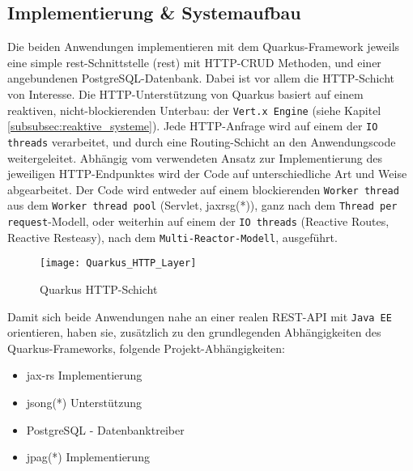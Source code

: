 \subsection{Implementierung \& Systemaufbau}
\label{section:implementierung}
Die beiden Anwendungen implementieren mit dem Quarkus-Framework jeweils eine simple \acrshort{rest}-Schnittstelle (\acrlong{rest})
mit HTTP-CRUD Methoden, und einer angebundenen PostgreSQL-Datenbank.
Dabei ist vor allem die HTTP-Schicht von Interesse. Die HTTP-Unterstützung von Quarkus basiert auf einem reaktiven, nicht-blockierenden
Unterbau: der \verb|Vert.x Engine| (siehe Kapitel \ref{subsubsec:reaktive_systeme}).
Jede HTTP-Anfrage wird auf einem der \verb|IO threads|
verarbeitet, und durch eine Routing-Schicht an den Anwendungscode weitergeleitet.
Abhängig vom verwendeten Ansatz zur Implementierung des jeweiligen HTTP-Endpunktes wird der Code auf unterschiedliche Art und Weise abgearbeitet.
Der Code wird entweder auf einem blockierenden \verb|Worker thread| aus dem \verb|Worker thread pool| (Servlet, \Gls{jaxrsg}(*)),
ganz nach dem \verb|Thread per request|-Modell, oder weiterhin auf einem der \verb|IO threads| (Reactive Routes, Reactive Resteasy),
nach dem \verb|Multi-Reactor-Modell|, ausgeführt.
\newpage
\begin{figure}[h]
  \centering
  \texttt{[image: Quarkus\_HTTP\_Layer]}
  \caption{Quarkus HTTP-Schicht \parencite{QuarkusReactiveRoutes}}
  \label{fig:quarkus_http_schicht}
\end{figure}
Damit sich beide Anwendungen nahe an einer realen REST-API mit \verb|Java EE| orientieren, haben
sie, zusätzlich zu den grundlegenden Abhängigkeiten des Quarkus-Frameworks, folgende Projekt-Abhängigkeiten:
\begin{itemize}
  \item \acrshort{jax-rs} Implementierung
  \item \Gls{jsong}(*) Unterstützung
  \item PostgreSQL - Datenbanktreiber
  \item \Gls{jpag}(*) Implementierung
\end{itemize}

